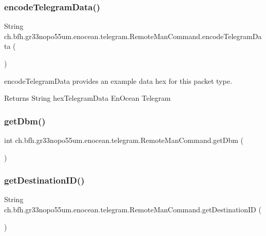 \subsubsection{\texorpdfstring{encode\+Telegram\+Data()}{encodeTelegramData()}}
{\footnotesize\ttfamily String ch.\+bfh.\+gr33nopo55um.\+enocean.\+telegram.\+Remote\+Man\+Command.\+encode\+Telegram\+Data (\begin{DoxyParamCaption}{ }\end{DoxyParamCaption})}

encode\+Telegram\+Data provides an example data hex for this packet type.

\begin{DoxyReturn}{Returns}
String hex\+Telegram\+Data En\+Ocean Telegram 
\end{DoxyReturn}
\hypertarget{classch_1_1bfh_1_1gr33nopo55um_1_1enocean_1_1telegram_1_1_remote_man_command_af87090957175a82debea309582f4eaf0}{}\label{classch_1_1bfh_1_1gr33nopo55um_1_1enocean_1_1telegram_1_1_remote_man_command_af87090957175a82debea309582f4eaf0} 
\subsubsection{\texorpdfstring{get\+Dbm()}{getDbm()}}
{\footnotesize\ttfamily int ch.\+bfh.\+gr33nopo55um.\+enocean.\+telegram.\+Remote\+Man\+Command.\+get\+Dbm (\begin{DoxyParamCaption}{ }\end{DoxyParamCaption})}

\hypertarget{classch_1_1bfh_1_1gr33nopo55um_1_1enocean_1_1telegram_1_1_remote_man_command_ad7a6d78d341a325b40a2754aadb6ff26}{}\label{classch_1_1bfh_1_1gr33nopo55um_1_1enocean_1_1telegram_1_1_remote_man_command_ad7a6d78d341a325b40a2754aadb6ff26} 
\subsubsection{\texorpdfstring{get\+Destination\+I\+D()}{getDestinationID()}}
{\footnotesize\ttfamily String ch.\+bfh.\+gr33nopo55um.\+enocean.\+telegram.\+Remote\+Man\+Command.\+get\+Destination\+ID (\begin{DoxyParamCaption}{ }\end{DoxyParamCaption})}

